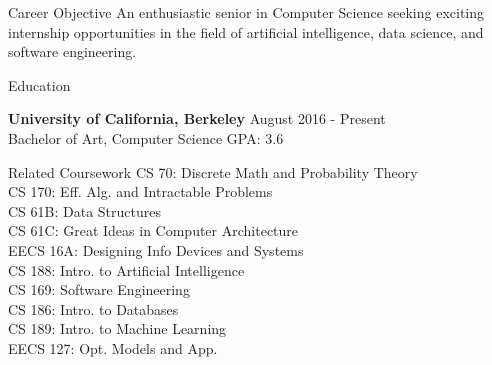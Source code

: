 \documentclass{resume} %
\begin{document}

\begin{rSection}{Career Objective}
An enthusiastic senior in Computer Science seeking exciting internship opportunities in the field of artificial
intelligence, data science, and software engineering.
\end{rSection}


\begin{rSection}{Education}

{\bf University of California, Berkeley} \hfill {August 2016 - Present} 
\\ Bachelor of Art, Computer Science \hfill{GPA: 3.6}

\end{rSection}


\begin{rSection2}{Related Coursework}
CS 70: Discrete Math and Probability Theory
\\ CS 170: Eff. Alg. and Intractable Problems
\\ CS 61B: Data Structures
\\ CS 61C: Great Ideas in Computer Architecture
\\ EECS 16A: Designing Info Devices and Systems
\\ CS 188: Intro. to Artificial Intelligence
\\ CS 169: Software Engineering
\\ CS 186: Intro. to Databases
\\ CS 189: Intro. to Machine Learning
\\ EECS 127: Opt. Models and App.
\end{rSection2}

\end{document}
